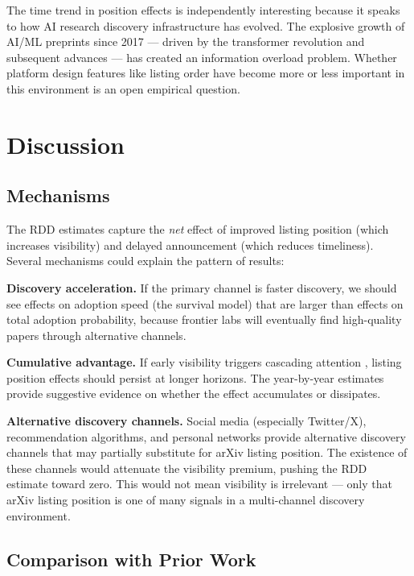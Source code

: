 \documentclass[12pt]{article}
\begin{document}
The time trend in position effects is independently interesting because it speaks to how AI research discovery infrastructure has evolved. The explosive growth of AI/ML preprints since 2017 --- driven by the transformer revolution \citep{vaswani2017} and subsequent advances \citep{devlin2019, brown2020} --- has created an information overload problem. Whether platform design features like listing order have become more or less important in this environment is an open empirical question.


\section{Discussion}

\subsection{Mechanisms}

The RDD estimates capture the \textit{net} effect of improved listing position (which increases visibility) and delayed announcement (which reduces timeliness). Several mechanisms could explain the pattern of results:

\textbf{Discovery acceleration.} If the primary channel is faster discovery, we should see effects on adoption speed (the survival model) that are larger than effects on total adoption probability, because frontier labs will eventually find high-quality papers through alternative channels.

\textbf{Cumulative advantage.} If early visibility triggers cascading attention \citep{merton1968, wang2013}, listing position effects should persist at longer horizons. The year-by-year estimates provide suggestive evidence on whether the effect accumulates or dissipates.

\textbf{Alternative discovery channels.} Social media (especially Twitter/X), recommendation algorithms, and personal networks provide alternative discovery channels that may partially substitute for arXiv listing position. The existence of these channels would attenuate the visibility premium, pushing the RDD estimate toward zero. This would not mean visibility is irrelevant --- only that arXiv listing position is one of many signals in a multi-channel discovery environment.

\subsection{Comparison with Prior Work}
\end{document}
